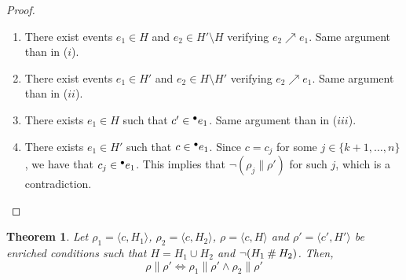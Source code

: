 \documentclass[12pt,a4paper]{article}
\newtheorem{theorem}{Theorem}
\newcommand{\confl}{\ensuremath\mathbin\#}
\begin{document}
\begin{proof}
\begin{enumerate}[1.]
\item There exist events $e_1 \in H$ and $e_2 \in H' \setminus H$ verifying
$e_2 \nearrow e_1$.  Same argument than in ($i$).

\item There exist events $e_1 \in H'$ and $e_2 \in H \setminus H'$ verifying
$e_2 \nearrow e_1$.  Same argument than in ($ii$).

\item There exists $e_1 \in H$ such that $c' \in {}^\bullet e_1$.  Same argument
than in ($iii$).

\item There exists $e_1 \in H'$ such that $c \in {}^\bullet e_1$.  Since $c = c_j$
for some $j \in \{k+1, \ldots, n\}$, we have that $c_j \in {}^\bullet e_1$.  This
implies that $\lnot (\rho_j \parallel \rho')$ for such $j$, which is a
contradiction.
\end{enumerate}
\end{proof}


\begin{theorem}
Let $\rho_1 = \langle c, H_1 \rangle$, $\rho_2 = \langle c, H_2 \rangle$, $\rho
= \langle c, H \rangle$ and $\rho' = \langle c', H' \rangle$ be enriched
conditions such that $H = H_1 \cup H_2$ and $\lnot (H_1 \confl H_2)$.  Then,
$$\rho \parallel \rho' \iff \rho_1 \parallel \rho' \land \rho_2 \parallel
\rho'$$
\end{theorem}
\end{document}
